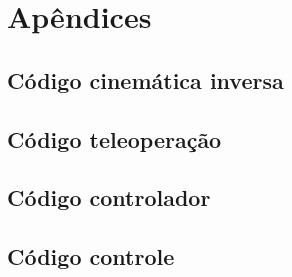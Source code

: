 \thispagestyle{plain}
\section*{Apêndices}

\subsection*{Código cinemática inversa}



\subsection*{Código teleoperação}



\subsection*{Código controlador}



\subsection*{Código controle}

